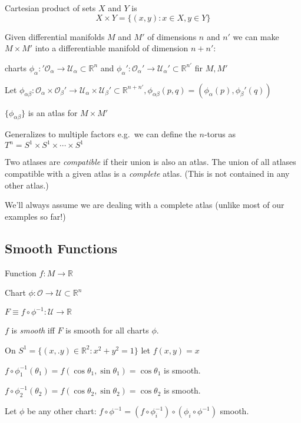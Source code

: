 \documentclass[a4paper,11pt]{article}
\DeclareMathOperator{\cpf}{\circ}
\begin{document}
	\begin{ex}
		Cartesian product of sets $X$ and $Y$ is
		\[
			X \times Y = \{(x,y): x\in X, y\in Y\}
		\]
		
		Given differential manifolds $M$ and $M'$ of dimensions $n$ and $n'$ we can make $M \times M'$ into a differentiable manifold of dimension $n + n'$:

		charts $\phi_\alpha: '\mathcal{O}_\alpha \to \mathcal{U}_\alpha \subset \mathbb{R}^n$ and $\phi_\alpha' : \mathcal{O}_\alpha' \to \mathcal{U}_\alpha' \subset \mathbb{R}^{n'}$ fir $M,M'$ 

		Let $\phi_{\alpha\beta}: \mathcal{O}_\alpha \times \mathcal{O}_\beta' \to \mathcal{U}_\alpha \times \mathcal{U}_\beta' \subset \mathbb{R}^{n + n'}, \phi_{\alpha\beta}(p,q) = (\phi_\alpha(p),\phi_\beta'(q))$

		$\{\phi_{\alpha\beta}\}$ is an atlas for $M\times M'$ 

		Generalizes to multiple factors e.g.\ we can define the $n$-torus as $T^n = S^1 \times S^1 \times \cdots \times S^1$ 
	\end{ex}

	\begin{defi}
		Two atlases are \emph{compatible} if their union is also an atlas. The union of all atlases compatible with a given atlas is a \emph{complete} atlas. (This is not contained in any other atlas.)
	\end{defi}

	We'll always assume we are dealing with a complete atlas (unlike most of our examples so far!)

	\subsection{Smooth Functions}
	Function $f: M \to \mathbb{R}$

	Chart $\phi: \mathcal{O} \to \mathcal{U} \subset \mathbb{R}^n$
	
	$F \equiv f \cpf \phi^{-1}: \mathcal{U}\to \mathbb{R}$
	
	\begin{defi}
		$f$ is \emph{smooth} iff $F$ is smooth for all charts $\phi$.
	\end{defi}

	\begin{ex}
		On $S^1 = \{(x,.y) \in \mathbb{R}^2 : x^2+y^2 = 1\}$ let $f(x,y) = x$ 

		$f \cpf \phi_1^{-1}(\theta_1) = f(\cos \theta_1 , \sin \theta_1) = \cos \theta_1$ is smooth.
		
		$f \cpf \phi_2^{-1}(\theta_2) = f(\cos \theta_2 , \sin \theta_2) = \cos \theta_2$ is smooth.

		Let $\phi$ be any other chart: $f \cpf \phi^{-1} = (f \cpf \phi_i^{-1}) \cpf (\phi_i \cpf \phi^{-1})$ smooth.
	\end{ex}
\end{document}
